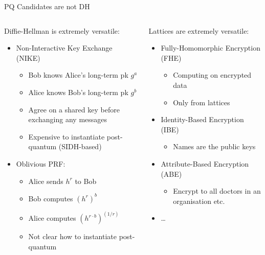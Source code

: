 \documentclass[xcolor=table,10pt,aspectratio=169]{beamer}
\begin{document}
\begin{frame}[label={sec:org392e707}]{PQ Candidates are not DH}
\begin{columns}[t]
\begin{column}{0.5\columnwidth}
Diffie-Hellman is extremely versatile:

\begin{itemize}
\item \alert{Non-Interactive} Key Exchange (NIKE)
\begin{itemize}
\item Bob knows Alice’s long-term pk \(g^a\)
\item Alice knows Bob’s long-term pk \(g^b\)
\item Agree on a shared key before exchanging any messages
\item Expensive to instantiate post-quantum (SIDH-based)
\end{itemize}
\item Oblivious PRF:
\begin{itemize}
\item Alice sends \(h^{r}\) to Bob
\item Bob computes \((h^{r})^b\)
\item Alice computes \((h^{r \cdot b})^{(1/r)}\)
\item Not clear how to instantiate post-quantum
\end{itemize}
\end{itemize}
\end{column}

\begin{column}{0.5\columnwidth}
Lattices are extremely versatile:

\begin{itemize}
\item Fully-Homomorphic Encryption (FHE)
\begin{itemize}
\item Computing on encrypted data
\item Only from lattices
\end{itemize}
\item Identity-Based Encryption (IBE)
\begin{itemize}
\item Names \alert{are} the public keys
\end{itemize}
\item Attribute-Based Encryption (ABE)
\begin{itemize}
\item Encrypt to all doctors in an organisation etc.
\end{itemize}
\item \ldots
\end{itemize}
\end{column}
\end{columns}
\end{frame}
\end{document}
